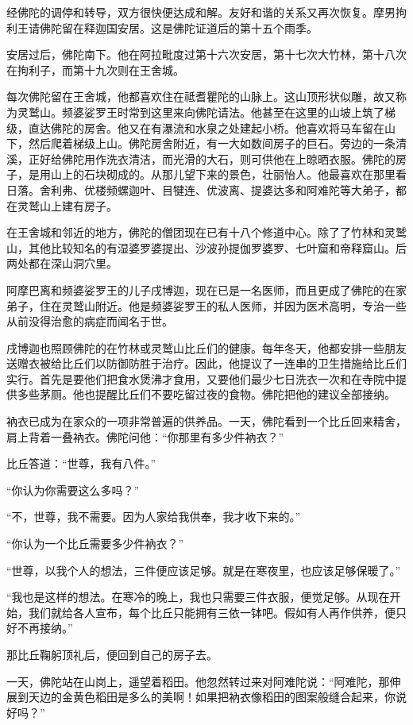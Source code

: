 \documentclass[12pt,twoside,openany]{book}
\begin{document}
经佛陀的调停和转导，双方很快便达成和解。友好和谐的关系又再次恢复。摩男拘利王请佛陀留在释迦国安居。这是佛陀证道后的第十五个雨季。

安居过后，佛陀南下。他在阿拉毗度过第十六次安居，第十七次大竹林，第十八次在拘利子，而第十九次则在王舍城。

每次佛陀留在王舍城，他都喜欢住在祗耆瞿陀的山脉上。这山顶形状似雕，故又称为灵鹫山。频婆娑罗王时常到这里来向佛陀请法。他甚至在这里的山坡上筑了梯级，直达佛陀的房舍。他又在有瀑流和水泉之处建起小桥。他喜欢将马车留在山下，然后爬着梯级上山。佛陀房舍附近，有一大如数间房子的巨石。旁边的一条清溪，正好给佛陀用作洗衣清洁，而光滑的大石，则可供他在上晾晒衣服。佛陀的房子，是用山上的石块砌成的。从那儿望下来的景色，壮丽怡人。他最喜欢在那里看日落。舍利弗、优楼频螺迦叶、目犍连、优波离、提婆达多和阿难陀等大弟子，都在灵鹫山上建有房子。

在王舍城和邻近的地方，佛陀的僧团现在已有十八个修道中心。除了了竹林和灵鹫山，其他比较知名的有湿婆罗婆提出、沙波孙提伽罗婆罗、七叶窟和帝释窟山。后两处都在深山洞穴里。

阿摩巴离和频婆娑罗王的儿子戌博迦，现在已是一名医师，而且更成了佛陀的在家弟子，住在灵鹫山附近。他是频婆娑罗王的私人医师，并因为医术高明，专治一些从前没得治愈的病症而闻名于世。

戌博迦也照顾佛陀的在竹林或灵鹫山比丘们的健康。每年冬天，他都安排一些朋友送赠衣被给比丘们以防御防胜于治疗。因此，他提议了一连串的卫生措施给比丘们实行。首先是要他们把食水煲沸才食用，又要他们最少七日洗衣一次和在寺院中提供多些茅厕。他也提醒比丘们不要吃留过夜的食物。佛陀把他的建议全部接纳。

衲衣已成为在家众的一项非常普遍的供养品。一天，佛陀看到一个比丘回来精舍，肩上背着一叠衲衣。佛陀问他：“你那里有多少件衲衣？”

比丘答道：“世尊，我有八件。”

“你认为你需要这么多吗？”

“不，世尊，我不需要。因为人家给我供奉，我才收下来的。”

“你认为一个比丘需要多少件衲衣？”

“世尊，以我个人的想法，三件便应该足够。就是在寒夜里，也应该足够保暖了。”

“我也是这样的想法。在寒冷的晚上，我也只需要三件衣服，便觉足够。从现在开始，我们就给各人宣布，每个比丘只能拥有三依一钵吧。假如有人再作供养，便只好不再接纳。”

那比丘鞠躬顶礼后，便回到自己的房子去。

一天，佛陀站在山岗上，遥望着稻田。他忽然转过来对阿难陀说：“阿难陀，那伸展到天边的金黄色稻田是多么的美啊！如果把衲衣像稻田的图案般缝合起来，你说好吗？”
\end{document}
